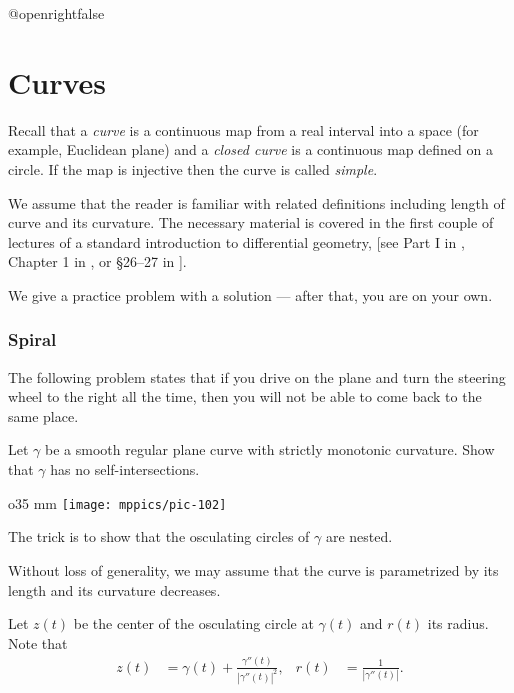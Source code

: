 \csname @openrightfalse\endcsname
\chapter{Curves}

Recall that a \emph{curve} is a continuous map 
from a real interval into a space (for example, Euclidean plane)
and 
a {}\emph{closed curve} is a continuous map defined on a circle.
If the map is injective then the curve is called {}\emph{simple}.

We assume that the reader is familiar with related definitions including 
length of curve 
and its curvature.
The necessary material is covered in the first couple of lectures 
of a standard introduction to differential geometry, [see Part I in , Chapter 1 in , or \S26--27 in ].

\medskip

We give a practice problem with a solution --- after that, you are on your own.

\subsection*{Spiral}
\label{spiral}

The following problem states that 
if you drive on the plane and turn the steering wheel to the right all the time,
then you will not be able to come back to the same place.

\begin{pr}
Let $\gamma$ be a smooth regular plane curve with strictly monotonic curvature. 
Show that $\gamma$ has no self-intersections.
\end{pr}

\begin{wrapfigure}{o}{35 mm}
\centering
\texttt{[image: mppics/pic-102]}
\end{wrapfigure}

The trick is to show that the osculating circles of $\gamma$ are nested.

\medskip

Without loss of generality, we may assume that the curve is parametrized by its length and its
curvature decreases.

Let $z(t)$ be the center of the osculating circle at $\gamma(t)$
and $r(t)$ its radius.
Note that 
\begin{align*}
z(t)&=\gamma(t)+\tfrac{\gamma''(t)}{|\gamma''(t)|^2},
&
r(t)&=\tfrac{1}{|\gamma''(t)|}.
\end{align*}

